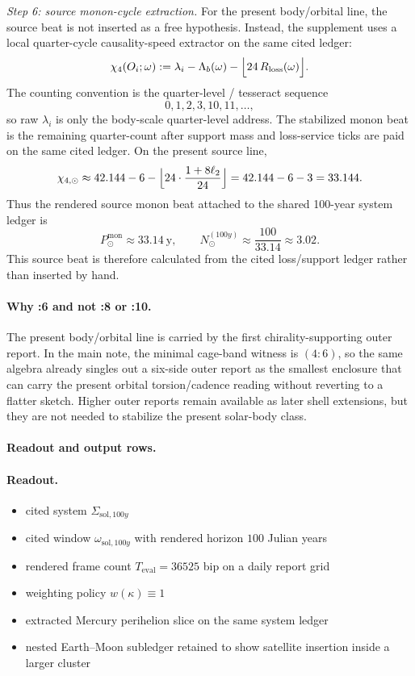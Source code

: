 \textit{Step 6: source monon-cycle extraction.} For the present body/orbital line, the source beat is not inserted as a free hypothesis. Instead, the supplement uses a local quarter-cycle causality-speed extractor on the same cited ledger:
\[
\chi_4(O_i;\omega) := \lambda_i - \Lambda_b(\omega) - \Bigl\lfloor 24\,R_{\mathrm{loss}}(\omega)\Bigr\rfloor.
\]
The counting convention is the quarter-level / tesseract sequence
\[
0,1,2,3,10,11,\ldots,
\]
so raw $\lambda_i$ is only the body-scale quarter-level address. The stabilized monon beat is the remaining quarter-count after support mass and loss-service ticks are paid on the same cited ledger. On the present source line,
\[
\chi_{4,\odot}
\approx
42.144 - 6 - \Bigl\lfloor 24\cdot\frac{1+8\ell_2}{24}\Bigr\rfloor
=
42.144 - 6 - 3
=
33.144.
\]
Thus the rendered source monon beat attached to the shared 100-year system ledger is
\[
P^{\mathrm{mon}}_{\odot} \approx 33.14\ \mathrm{y},
\qquad
N^{(100y)}_{\odot} \approx \frac{100}{33.14} \approx 3.02.
\]
This source beat is therefore calculated from the cited loss/support ledger rather than inserted by hand.

\paragraph{Why :6 and not :8 or :10.} The present body/orbital line is carried by the first chirality-supporting outer report. In the main note, the minimal cage-band witness is $(4{:}6)$, so the same algebra already singles out a six-side outer report as the smallest enclosure that can carry the present orbital torsion/cadence reading without reverting to a flatter sketch. Higher outer reports remain available as later shell extensions, but they are not needed to stabilize the present solar-body class.

\paragraph{Readout and output rows.}
\paragraph{Readout.}
\begin{itemize}
\item cited system $\Sigma_{\mathrm{sol},100y}$
\item cited window $\omega_{\mathrm{sol},100y}$ with rendered horizon $100$ Julian years
\item rendered frame count $T_{\mathrm{eval}} = 36525$ bip on a daily report grid
\item weighting policy $w(\kappa)\equiv 1$
\item extracted Mercury perihelion slice on the same system ledger
\item nested Earth--Moon subledger retained to show satellite insertion inside a larger cluster
\end{itemize}

